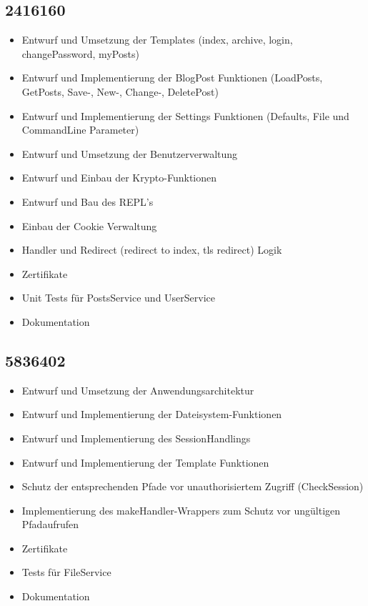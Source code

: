 \documentclass[10pt]{article}
\begin{document}
		\subsection{2416160}
		\begin{itemize}
			\item Entwurf und Umsetzung der Templates (index, archive, login, changePassword, myPosts)
			\item Entwurf und Implementierung der BlogPost Funktionen (LoadPosts, GetPosts, Save-, New-, Change-, DeletePost)
			\item Entwurf und Implementierung der Settings Funktionen (Defaults, File und CommandLine Parameter)
			\item Entwurf und Umsetzung der Benutzerverwaltung
			\item Entwurf und Einbau der Krypto-Funktionen
			\item Entwurf und Bau des REPL's
			\item Einbau der Cookie Verwaltung
			\item Handler und Redirect (redirect to index, tls redirect) Logik
			\item Zertifikate
			\item Unit Tests f\"ur PostsService und UserService
			\item Dokumentation
		\end{itemize}
		\subsection{5836402}
		\begin{itemize}
			\item Entwurf und Umsetzung der Anwendungsarchitektur
			\item Entwurf und Implementierung der Dateisystem-Funktionen
			\item Entwurf und Implementierung des SessionHandlings
			\item Entwurf und Implementierung der Template Funktionen
			\item Schutz der entsprechenden Pfade vor unauthorisiertem Zugriff (CheckSession)
			\item Implementierung des makeHandler-Wrappers zum Schutz vor ungültigen Pfadaufrufen
			\item Zertifikate
			\item Tests für FileService
			\item Dokumentation
		\end{itemize}
\end{document}
